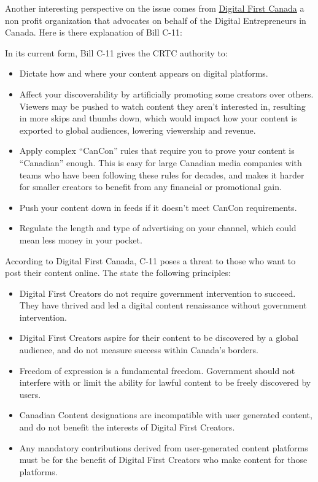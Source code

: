 \documentclass[
]{book}
\providecommand{\tightlist}{%
  \setlength{\itemsep}{0pt}\setlength{\parskip}{0pt}}
\theoremstyle{definition}
\theoremstyle{definition}
\theoremstyle{definition}
\theoremstyle{definition}
\theoremstyle{remark}
\begin{document}
\begin{reflect}
Another interesting perspective on the issue comes from \href{https://digitalfirstcanada.ca/fix-c11/}{Digital First Canada} a non profit organization that advocates on behalf of the Digital Entrepreneurs in Canada. Here is there explanation of Bill C-11:

In its current form, Bill C-11 gives the CRTC authority to:

\begin{itemize}
\tightlist
\item
  Dictate how and where your content appears on digital platforms.\\
\item
  Affect your discoverability by artificially promoting some creators over others. Viewers may be pushed to watch content they aren't interested in, resulting in more skips and thumbs down, which would impact how your content is exported to global audiences, lowering viewership and revenue.\\
\item
  Apply complex ``CanCon'' rules that require you to prove your content is ``Canadian'' enough. This is easy for large Canadian media companies with teams who have been following these rules for decades, and makes it harder for smaller creators to benefit from any financial or promotional gain.\\
\item
  Push your content down in feeds if it doesn't meet CanCon requirements.\\
\item
  Regulate the length and type of advertising on your channel, which could mean less money in your pocket.
\end{itemize}

According to Digital First Canada, C-11 poses a threat to those who want to post their content online. The state the following principles:

\begin{itemize}
\tightlist
\item
  Digital First Creators do not require government intervention to succeed. They have thrived and led a digital content renaissance without government intervention.\\
\item
  Digital First Creators aspire for their content to be discovered by a global audience, and do not measure success within Canada's borders.\\
\item
  Freedom of expression is a fundamental freedom. Government should not interfere with or limit the ability for lawful content to be freely discovered by users.\\
\item
  Canadian Content designations are incompatible with user generated content, and do not benefit the interests of Digital First Creators.\\
\item
  Any mandatory contributions derived from user-generated content platforms must be for the benefit of Digital First Creators who make content for those platforms.
\end{itemize}


\end{reflect}
\end{document}
